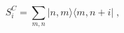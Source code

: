 \begin{equation}
\label{Cisometry}
  S^C_i=\sum_{m,n}^{}|n,m\rangle \langle m,n+i|\;,
\end{equation}


